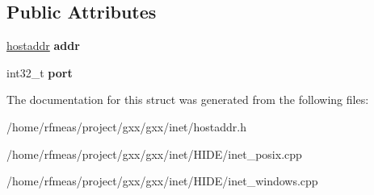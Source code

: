 \subsection*{Public Attributes}
\begin{DoxyCompactItemize}
\item 
\hyperlink{classgxx_1_1hostaddr}{hostaddr} {\bfseries addr}\hypertarget{structgxx_1_1inet_1_1netaddr_a3d8b2d4701cc6e5942eaaa1054b52db4}{}\label{structgxx_1_1inet_1_1netaddr_a3d8b2d4701cc6e5942eaaa1054b52db4}

\item 
int32\+\_\+t {\bfseries port}\hypertarget{structgxx_1_1inet_1_1netaddr_a8fc1aad61061f4bbb4ef8dea77b7d9f9}{}\label{structgxx_1_1inet_1_1netaddr_a8fc1aad61061f4bbb4ef8dea77b7d9f9}

\end{DoxyCompactItemize}


The documentation for this struct was generated from the following files\+:\begin{DoxyCompactItemize}
\item 
/home/rfmeas/project/gxx/gxx/inet/hostaddr.\+h\item 
/home/rfmeas/project/gxx/gxx/inet/\+H\+I\+D\+E/inet\+\_\+posix.\+cpp\item 
/home/rfmeas/project/gxx/gxx/inet/\+H\+I\+D\+E/inet\+\_\+windows.\+cpp\end{DoxyCompactItemize}
